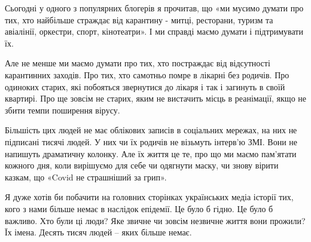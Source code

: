 Сьогодні у одного з популярних блогерів я прочитав, що «ми мусимо думати про
тих, хто найбільше страждає від карантину - митці, ресторани, туризм та
авіалінії, оркестри, спорт, кінотеатри». І ми справді маємо думати і
підтримувати їх. 

Але не менше ми маємо думати про тих, хто постраждає від відсутності
карантинних заходів. Про тих, хто самотньо помре в лікарні без родичів. Про
одиноких старих, які побояться звернутися до лікаря і так і загинуть в своїй
квартирі. Про ще зовсім не старих, яким не вистачить місць в реанімації, якщо
не збити темпи поширення вірусу.

Більшість цих людей не має облікових записів в соціальних мережах, на них не
підписані тисячі людей. У них чи їх родичів не візьмуть інтерв’ю ЗМІ. Вони не
напишуть драматичну колонку. Але їх життя це те, про що ми маємо пам’ятати
кожного дня, коли вирішуємо для себе чи одягнути маску, чи знову вірити казкам,
що «Covid не страшніший за грип».

Я дуже хотів би побачити на головних сторінках українських медіа історії тих,
кого з нами більше немає в наслідок епідемії. Це було б гідно. Це було б
важливо. Хто були ці люди? Яке звичне чи зовсім незвичне життя вони прожили? Їх
імена. Десять тисяч людей – яких більше немає.
